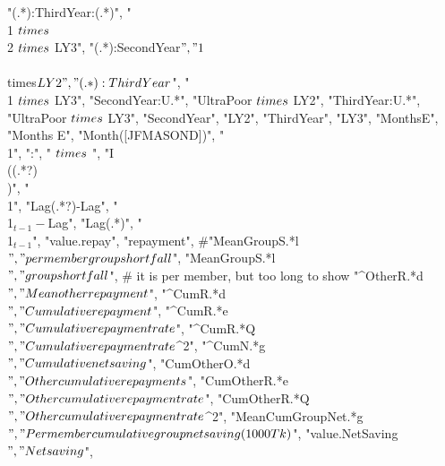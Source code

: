 \begin{Schunk}
\begin{Sinput}
    "(.*):ThirdYear:(.*)", "\\1 $\\\\times$ \\2 $\\\\times$ LY3",
    "(.*):SecondYear$", "\\1 $\\\\times$ LY2",
    "(.*):ThirdYear$", "\\1 $\\\\times$ LY3",
    "SecondYear:U.*", "UltraPoor $\\\\times$ LY2",
    "ThirdYear:U.*", "UltraPoor $\\\\times$ LY3",
    "SecondYear", "LY2",
    "ThirdYear", "LY3",
    "MonthsE", "Months E",
    "Month([JFMASOND])", "\\1",
    ":", " $\\\\times$ ",
    "I\\((.*?)\\)", "\\1",
    "Lag(.*?)-Lag", "\\1$_{t-1}-$Lag",
    "Lag(.*)", "\\1$_{t-1}$",
    "value.repay", "repayment",
    #"MeanGroupS.*l\\$", "per member group shortfall$",
    "MeanGroupS.*l\\$", "group shortfall$", # it is per member, but too long to show
    "^OtherR.*d\\$", "Mean other repayment$",
    "^CumR.*d\\$", "Cumulative repayment$",
    "^CumR.*e\\$", "Cumulative repayment rate$",
    "^CumR.*Q\\$", "Cumulative repayment rate$^{2}",
    "^CumN.*g\\$", "Cumulative net saving$",
    "CumOtherO.*d\\$", "Other cumulative repayments$",
    "CumOtherR.*e\\$", "Other cumulative repayment rate$",
    "CumOtherR.*Q\\$", "Other cumulative repayment rate$^{2}",
    "MeanCumGroupNet.*g\\$", "Per member cumulative group net saving (1000Tk)$",
    "value.NetSaving\\$", "Net saving$",

\end{Sinput}
\end{Schunk}
